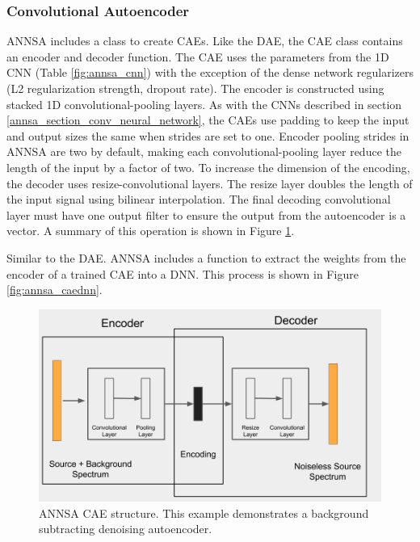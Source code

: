 \subsubsection{Convolutional Autoencoder}

ANNSA includes a class to create CAEs. Like the DAE, the CAE class contains an encoder and decoder function. The CAE uses the parameters from the 1D CNN (Table \ref{fig:annsa_cnn}) with the exception of the dense network regularizers (L2 regularization strength, dropout rate). The encoder is constructed using stacked 1D convolutional-pooling layers. As with the CNNs described in section \ref{annsa_section_conv_neural_network}, the CAEs use padding to keep the input and output sizes the same when strides are set to one. Encoder pooling strides in ANNSA are two by default, making each convolutional-pooling layer reduce the length of the input by a factor of two. To increase the dimension of the encoding, the decoder uses resize-convolutional layers. The resize layer doubles the length of the input signal using bilinear interpolation. The final decoding convolutional layer must have one output filter to ensure the output from the autoencoder is a vector. A summary of this operation is shown in Figure \ref{fig:annsa_cae}.

Similar to the DAE. ANNSA includes a function to extract the weights from the encoder of a trained CAE into a DNN. This process is shown in Figure \ref{fig:annsa_caednn}.

\begin{figure}[H]
\centering
\includegraphics[trim=0 0 30 0,clip,width=1.0\linewidth]{images/annsa_cae.png}
\caption{ANNSA CAE structure. This example demonstrates a background subtracting denoising autoencoder.}
\label{fig:annsa_cae}
\end{figure}

